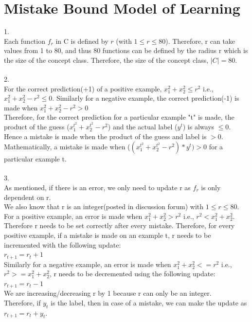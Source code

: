 \documentclass[12pt, fullpage,letterpaper]{article}
\begin{document}
\section{Mistake Bound Model of Learning}
1.\\
Each function $f_r$ in C is defined by $r$ (with
$1 \leq r \leq 80$). Therefore, r can take values from 1 to 80, and thus 80 functions can be defined by the radius r which is the size of the concept class. Therefore, the size of the concept class, $|C|=80$.\\\\
2.\\
For the correct prediction(+1) of a  positive example, $ x_1^2 + x_2^2 \leq r^2$  i.e., $ x_1^2 + x_2^2 - r^2 \leq 0$. Similarly for a negative example, the correct prediction(-1) is made when $ x_1^2 + x_2^2 - r^2 > 0$\\
Therefore, for the correct prediction for a particular example "t" is made, the product of the guess ($x_1^{t^2} + x_2^{t^2} - r^2$) and the actual label ($y^t$) is always $\leq 0$. Hence a mistake is made when the product of the guess and label is $>0$.\\
Mathematically, a mistake is made when ($(x_1^{t^2} + x_2^{t^2} - r^2)*y^t)>0$ for a particular example t.\\\\
3.\\
As mentioned, if there is an error, we only need to update r as $f_r$ is only dependent on r.\\
We also know that r is an integer(posted in discussion forum) with $1 \leq r \leq 80$.
\\For a positive example, an error is made when $ x_1^2 + x_2^2 > r^2$ i.e., $r^2<x_1^2 + x_2^2  $. Therefore r needs to be set correctly after every mistake. Therefore, for every positive example, if a mistake is made on an example t, r needs to be incremented with the following update:\\
$r_{t+1}=r_t+1$\\
Similarly for a negative example, an error is made when $ x_1^2 + x_2^2 <= r^2$ i.e., $r^2>=x_1^2 + x_2^2  $, r needs to be decremented using the following update:\\
$r_{t+1}=r_t-1$\\
We are increasing/decreasing r by 1 because r can only be an integer. \\
Therefore, if $y_t$ is the label, then in case of a mistake, we can make the update as $r_{t+1}=r_t+y_t$.
\\\\
\end{document}
